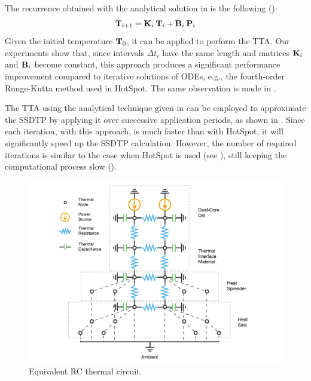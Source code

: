 The recurrence obtained with the analytical solution in  is the following ():
\[
  \mathbf{T}_{i+1} = \mathbf{K}_i \: \mathbf{T}_i + \mathbf{B}_i \: \mathbf{P}_i
\]
Given the initial temperature $\mathbf{T}_0$, it can be applied to perform the TTA. Our experiments show that, since intervals $\Delta t_i$ have the same length and matrices $\mathbf{K}_i$ and $\mathbf{B}_i$ become constant, this approach produces a significant performance improvement compared to iterative solutions of ODEs, e.g., the fourth-order Runge-Kutta method used in HotSpot. The same observation is made in \cite{thiele2011}.

The TTA using the analytical technique given in  can be employed to approximate the SSDTP by applying it over successive application periods, as shown in . Since each iteration, with this approach, is much faster than with HotSpot, it will significantly speed up the SSDTP calculation. However, the number of required iterations is similar to the case when HotSpot is used (see ), still keeping the computational process slow ().
\begin{figure}[t]
  \centering
  \includegraphics[width=\linewidth]{assets/circuit.pdf}
  \vspace{-15pt}
  \caption{Equivalent RC thermal circuit.}
  \label{fig:circuit}
  \vspace{15pt}
\end{figure}
